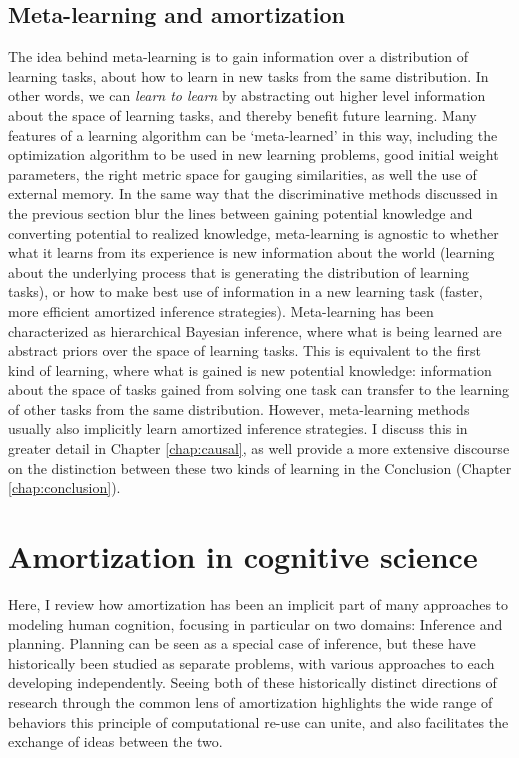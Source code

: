 \subsection{Meta-learning and amortization}
The idea behind meta-learning is to gain information over a distribution of learning tasks, about how to learn in new tasks from the same distribution. In other words, we can \textit{learn to learn} by abstracting out higher level information about the space of learning tasks, and thereby benefit future learning. Many features of a learning algorithm can be `meta-learned' in this way, including the optimization algorithm to be used in new learning problems\citep{andrychowicz2016learning}, good initial weight parameters\citep{finn2017model}, the right metric space for gauging similarities\citep{vinyals2016matching}, as well the use of external memory\citep{santoro2016meta}.  In the same way that the discriminative methods discussed in the previous section blur the lines between gaining potential knowledge and converting potential to realized knowledge, meta-learning is agnostic to whether what it learns from its experience is new information about the world (learning about the underlying process that is generating the distribution of learning tasks), or how to make best use of information in a new learning task (faster, more efficient amortized inference strategies). Meta-learning has been characterized as hierarchical Bayesian inference, where what is being learned are abstract priors over the space of learning tasks. This is equivalent to the first kind of learning, where what is gained is new potential knowledge: information about the space of tasks gained from solving one task can transfer to the learning of other tasks from the same distribution.\citep{ortega2019meta, grant2018recasting, griffiths2019doing} However, meta-learning methods usually also implicitly learn amortized inference strategies. I discuss this in greater detail in Chapter \ref{chap:causal}, as well provide a more extensive discourse on the distinction between these two kinds of learning in the Conclusion (Chapter \ref{chap:conclusion}).

\section{Amortization in cognitive science}

Here, I review how amortization has been an implicit part of many approaches to modeling human cognition, focusing in particular on two domains: Inference and planning. Planning can be seen as a special case of inference\citep{botvinick2012planning}, but these have historically been studied as separate problems, with various approaches to each developing independently. Seeing both of these historically distinct directions of research through the common lens of amortization highlights the wide range of behaviors this principle of computational re-use can unite, and also facilitates the exchange of ideas between the two. %


